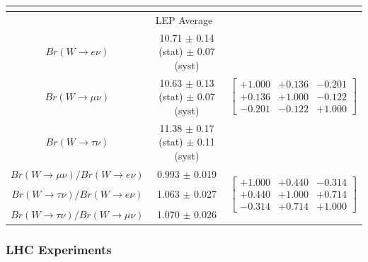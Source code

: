 \begin{table}[ht]
{\begin{tabular}{ |c| c  c | }
         \multicolumn{3}{c}{} \\
         \hline
         \multicolumn{3}{|c|}{LEP Average \cite{Schael:2013ita}} \\
         \hline
         $Br(W\to e    \nu)$    & 10.71 $\pm$ 0.14 (stat) $\pm$ 0.07 (syst) & 
         \multirow{3}{*}{
            \begin{footnotesize}
            $\begin{bmatrix}
                +1.000 &+0.136 &-0.201 \\ 
                +0.136 &+1.000 &-0.122 \\
                -0.201 &-0.122 &+1.000 
            \end{bmatrix}$ 
            \end{footnotesize} 
         } \\
         $Br(W\to \mu  \nu)$    & 10.63 $\pm$ 0.13 (stat) $\pm$ 0.07 (syst) & \\ 
         $Br(W\to \tau \nu)$    & 11.38 $\pm$ 0.17 (stat) $\pm$ 0.11 (syst) & \\
         \hline
         $Br(W\to \mu  \nu)/ Br(W\to e \nu)$ & 0.993  $\pm$ 0.019 & 
         \multirow{3}{*}{
            \begin{footnotesize}
            $\begin{bmatrix}
                +1.000 &+0.440 &-0.314 \\ 
                +0.440 &+1.000 &+0.714 \\
                -0.314 &+0.714 &+1.000 
            \end{bmatrix}$ 
            \end{footnotesize} 
         } \\
         $Br(W\to \tau \nu)/ Br(W\to e \nu)$ & 1.063  $\pm$ 0.027 & \\
         $Br(W\to \tau \nu)/ Br(W\to\mu\nu)$ & 1.070  $\pm$ 0.026 &  \\
         
         \hline
    \end{tabular}}
    \label{tab:relatedWorks:lu:W:lep}
\end{table}


\subsubsection{LHC Experiments}

